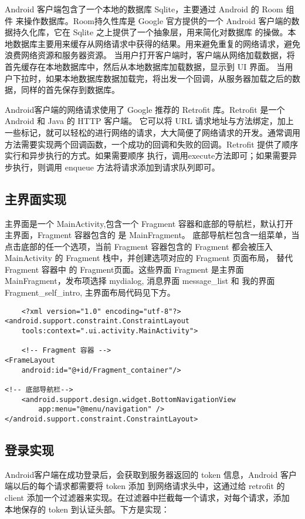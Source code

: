  Android 客户端包含了一个本地的数据库 Sqlite\cite{Sqlite}，主要通过 Android 的 Room 组件 来操作数据库。Room持久性库\cite{Room}是
 Google 官方提供的一个 Android 客户端的数据持久化库，它在 Sqlite 之上提供了一个抽象层，用来简化对数据库
 的操做。本地数据库主要用来缓存从网络请求中获得的结果。用来避免重复的网络请求，避免浪费网络资源和服务器资源。
 当用户打开客户端时，客户端从网络加载数据，将首先缓存在本地数据库中，然后从本地数据库加载数据，显示到 UI 界面。
 当用户下拉时，如果本地数据库数据加载完，将出发一个回调，从服务器加载之后的数据，同样的首先保存到数据库。

 Android客户端的网络请求使用了 Google 推荐的 Retrofit 库。Retrofit\cite{Retrofit} 是一个 Android 和 Java 的 HTTP 客户端。
 它可以将 URL 请求地址与方法绑定，加上一些标记，就可以轻松的进行网络的请求，大大简便了网络请求的开发。通常调用
 方法需要实现两个回调函数，一个成功的回调和失败的回调。Retrofit 提供了顺序实行和异步执行的方式。如果需要顺序
 执行，调用execute方法即可；如果需要异步执行，则调用 enqueue 方法将请求添加到请求队列即可。

\subsection{主界面实现}
主界面是一个 MainActivity,包含一个 Fragment 容器和底部的导航栏，默认打开主界面，Fragment 容器包含的
是 MainFragment。 底部导航栏包含一组菜单，当点击底部的任一个选项，当前 Fragment 容器包含的 Fragment
都会被压入 MainActivity 的 Fragment 栈中，并创建选项对应的 Fragment 页面布局， 替代 Fragment 容器中
的 Fragment页面。这些界面 Fragment 是主界面 MainFragment，发布项选择 mydialog, 消息界面 message\_list 和 
我的界面 Fragment\_self\_intro, 主界面布局代码见下方。

\begin{verbatim}
    <?xml version="1.0" encoding="utf-8"?>
<android.support.constraint.ConstraintLayout
    tools:context=".ui.activity.MainActivity">

    <!-- Fragment 容器 -->
<FrameLayout
    android:id="@+id/Fragment_container"/>

<!-- 底部导航栏-->
    <android.support.design.widget.BottomNavigationView
        app:menu="@menu/navigation" />
</android.support.constraint.ConstraintLayout>
\end{verbatim}

\subsection{登录实现}
Android客户端在成功登录后，会获取到服务器返回的 token 信息，Android 客户端以后的每个请求都需要将 token 添加
到网络请求头中，这通过给 retrofit 的 client 添加一个过滤器来实现。在过滤器中拦截每一个请求，对每个请求，添加
本地保存的 token 到认证头部。下方是实现：

